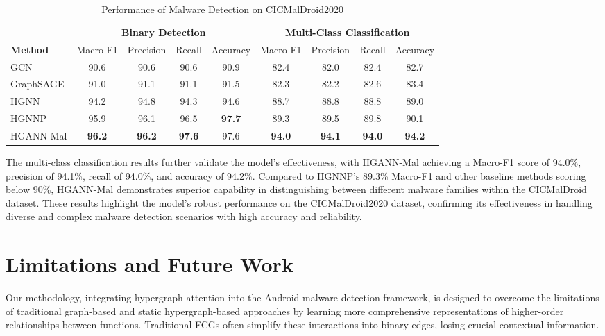 \documentclass[runningheads]{llncs}
\begin{document}
\begin{table}[!h]
\centering
\caption{Performance of Malware Detection on CICMalDroid2020}
\begin{tabular}{lcccccccc}
\toprule
& \multicolumn{4}{c}{\textbf{Binary Detection}} & \multicolumn{4}{c}{\textbf{Multi-Class Classification}} \\
\cmidrule(lr){2-5} \cmidrule(lr){6-9}
\textbf{Method} & Macro-F1 & Precision & Recall & Accuracy & Macro-F1 & Precision & Recall & Accuracy \\
\midrule
GCN \cite{kipf2016semi}              & 90.6 & 90.6 & 90.6 & 90.9 & 82.4 & 82.0 & 82.4 & 82.7 \\
GraphSAGE \cite{yumlembam2022iot}    & 91.0 & 91.1 & 91.1 & 91.5 & 82.3 & 82.2 & 82.6 & 83.4 \\
\midrule
HGNN \cite{zhang2023}    & 94.2 & 94.8 & 94.3 & 94.6 & 88.7 & 88.8 & 88.8 & 89.0 \\
HGNNP \cite{zhang2023}   & 95.9 & 96.1 & 96.5 & \textbf{97.7} & 89.3 & 89.5 & 89.8 & 90.1 \\
HGANN-Mal  & \textbf{96.2} & \textbf{96.2} & \textbf{97.6} & 97.6 & \textbf{94.0} & \textbf{94.1} & \textbf{94.0} & \textbf{94.2} \\
\bottomrule
\end{tabular}
\label{table:performance_CICMalDroid}
\end{table}

The multi-class classification results further validate the model's effectiveness, with HGANN-Mal achieving a Macro-F1 score of 94.0\%, precision of 94.1\%, recall of 94.0\%, and accuracy of 94.2\%. Compared to HGNNP's 89.3\% Macro-F1 and other baseline methods scoring below 90\%, HGANN-Mal demonstrates superior capability in distinguishing between different malware families within the CICMalDroid dataset. These results highlight the model's robust performance on the CICMalDroid2020 dataset, confirming its effectiveness in handling diverse and complex malware detection scenarios with high accuracy and reliability.

 

\section{Limitations and Future Work}
Our methodology, integrating hypergraph attention into the Android malware detection framework, is designed to overcome the limitations of traditional graph-based and static hypergraph-based approaches by learning more comprehensive representations of higher-order relationships between functions. Traditional FCGs often simplify these interactions into binary edges, losing crucial contextual information.
\end{document}
